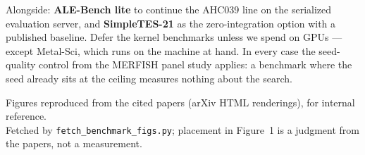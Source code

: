 \documentclass[11pt]{article}
\begin{document}
\noindent Alongside: \textbf{ALE-Bench lite} to continue the AHC039 line on the serialized
evaluation server, and \textbf{SimpleTES-21} as the zero-integration option with a published
baseline. Defer the kernel benchmarks unless we spend on GPUs --- except Metal-Sci, which runs on
the machine at hand. In every case the seed-quality control from the MERFISH panel study applies:
a benchmark where the seed already sits at the ceiling measures nothing about the search.

\vfill
\noindent\footnotesize Figures reproduced from the cited papers (arXiv HTML renderings), for
internal reference.\\
Fetched by \texttt{fetch\_benchmark\_figs.py}; placement in Figure~1 is a judgment from the papers,
not a measurement.
\end{document}

